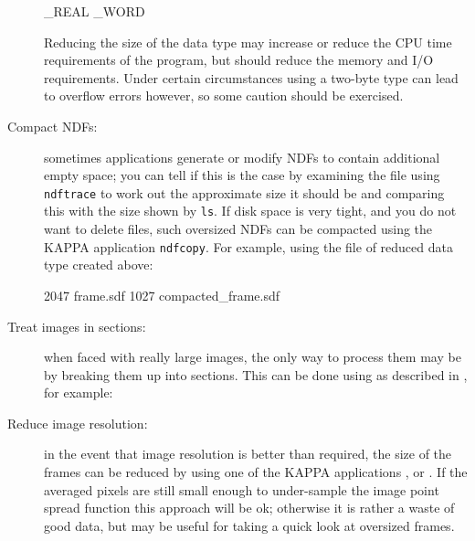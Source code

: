 \documentclass[twoside,11pt]{starlink}
\begin{document}
\begin{description}
\begin{small}
\begin{terminalv}
_REAL
_WORD
\end{terminalv}
\end{small}

   Reducing the size of the data type may increase or reduce the CPU time
   requirements of the program, but should reduce the memory and I/O
   requirements.
   Under certain circumstances using a two-byte type can lead to
   overflow errors however, so some caution should be exercised.

  \item[Compact NDFs:] sometimes applications generate or modify NDFs to
   contain additional empty space; you can tell if this is the case by
   examining the file using \texttt{ndftrace} to work out the approximate size
   it should be and comparing this with the size shown by \texttt{ls}.
   If disk space is very tight, and you do not want to delete files, such
   oversized NDFs can be compacted using the KAPPA application \texttt{ndfcopy}.
   For example, using the file of reduced data type created above:

\begin{small}
\begin{terminalv}
2047 frame.sdf
1027 compacted_frame.sdf
\end{terminalv}
\end{small}

  \item[Treat images in sections:] when faced with really large images, the
   only way to process them may be by breaking them up into sections.
   This can be done using 
   as described in \/\cite{SUN95}, for example:

\begin{small}
\begin{terminalv}
\end{terminalv}
\end{small}

  \item[Reduce image resolution:] in the event that image resolution is
   better than required, the size of the frames can be reduced by using one
   of the KAPPA applications
  ,
   or
  .
   If the averaged pixels are still small enough to under-sample the
   image point spread function this approach will be ok; otherwise it is
   rather a waste of good data, but may be useful for taking a quick look
   at oversized frames.

\end{description}
\end{document}

